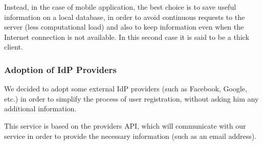 Instead, in the case of mobile application, the best choice is to save useful information on a local database, in order to avoid continuous requests to the server (less computational load) and also to keep information even when the Internet connection is not available. 
In this second case it is said to be a thick client.

\subsubsection{Adoption of IdP Providers}
We decided to adopt some external IdP providers (such as Facebook, Google, etc.) in order to simplify the process of user registration, without asking him any additional information.

This service is based on the providers API, which will communicate with our service in order to provide the necessary information (such as an email address).
